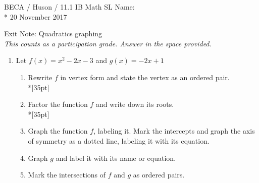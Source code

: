 \documentclass[]{book}
\begin{document}
\noindent BECA / Huson / 11.1 IB Math SL \hspace{2in} Name:\\*
20 November 2017
\begin{center}
{\Large Exit Note: Quadratics graphing}\\
\textit{This counts as a participation grade. Answer in the space provided.}
\end{center}



\begin{enumerate}

\item Let $f(x) = x^2-2x-3$ and $g(x)=-2x+1$
\begin{enumerate}
    \item Rewrite $f$ in vertex form and state the vertex as an ordered pair.\\*[35pt]
    \item Factor the function $f$ and write down its roots.\\*[35pt]
    \item Graph the function $f$, labeling it. Mark the intercepts and graph the axis of symmetry as a dotted line, labeling it with its equation.
    \item Graph $g$ and label it with its name or equation.
    \item Mark the intersections of $f$ and $g$ as ordered pairs. 

\end{enumerate}


\begin{figure}[!htbp]
\begin{center}
\end{center}
\end{figure}
\end{enumerate}
\end{document}
